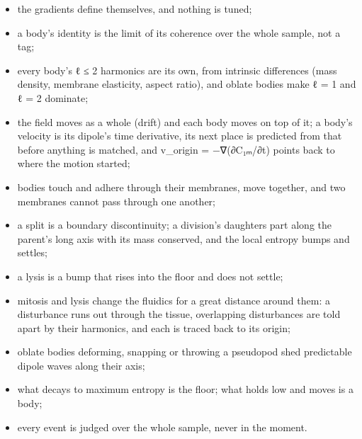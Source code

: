 \begin{itemize}
\item the gradients define themselves, and nothing is tuned;
\item a body's identity is the limit of its coherence over the whole sample, not a tag;
\item every body's ℓ ≤ 2 harmonics are its own, from intrinsic differences (mass density, membrane elasticity, aspect ratio), and oblate bodies make ℓ = 1 and ℓ = 2 dominate;
\item the field moves as a whole (drift) and each body moves on top of it; a body's velocity is its dipole's time derivative, its next place is predicted from that before anything is matched, and v\_\allowbreak{}origin = −∇(∂C₁ₘ/∂t) points back to where the motion started;
\item bodies touch and adhere through their membranes, move together, and two membranes cannot pass through one another;
\item a split is a boundary discontinuity; a division's daughters part along the parent's long axis with its mass conserved, and the local entropy bumps and settles;
\item a lysis is a bump that rises into the floor and does not settle;
\item mitosis and lysis change the fluidics for a great distance around them: a disturbance runs out through the tissue, overlapping disturbances are told apart by their harmonics, and each is traced back to its origin;
\item oblate bodies deforming, snapping or throwing a pseudopod shed predictable dipole waves along their axis;
\item what decays to maximum entropy is the floor; what holds low and moves is a body;
\item every event is judged over the whole sample, never in the moment.
\end{itemize}

